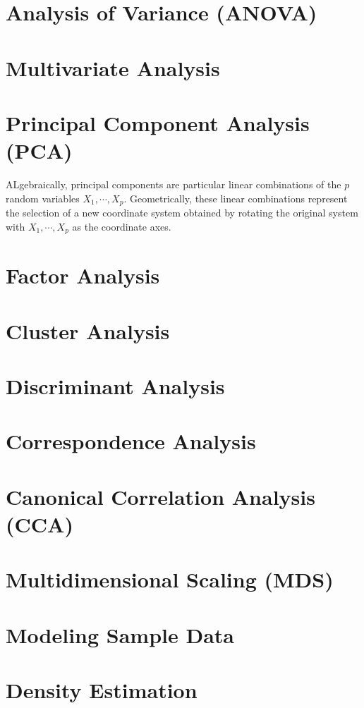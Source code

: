 \section{Analysis of Variance (ANOVA)}

\section{Multivariate Analysis}
\section{Principal Component Analysis (PCA)}
ALgebraically, principal components are particular linear combinations of the $p$ random variables $X_1, \cdots, X_p$. Geometrically, these linear combinations represent the selection of a new coordinate system obtained by rotating the original system with $X_1, \cdots, X_p$ as the coordinate axes.



\section{Factor Analysis}
\section{Cluster Analysis}
\section{Discriminant Analysis}
\section{Correspondence Analysis}
\section{Canonical Correlation Analysis (CCA)}
\section{Multidimensional Scaling (MDS)}

\section{Modeling Sample Data}
\section{Density Estimation}
